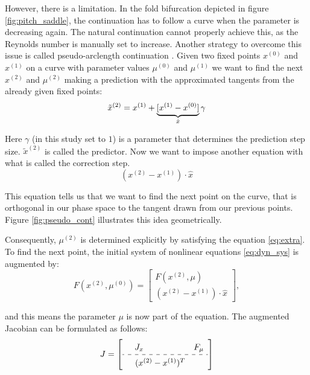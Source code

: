 However, there is a limitation. In the fold bifurcation depicted in figure
\ref{fig:pitch_saddle}, the continuation has to follow a curve when the
parameter is decreasing again. The natural continuation cannot properly achieve
this, as the Reynolds number is manually set to increase. Another strategy to
overcome this issue is called pseudo-arclength continuation
\citep{kuznetsov2004}. Given two fixed points $x^{(0)}$ and $x^{(1)}$ on a
curve with parameter values $\mu^{(0)}$ and $\mu^{(1)}$ we want to find the
next $x^{(2)}$ and $\mu^{(2)}$ making a prediction with the approximated
tangents from the already given fixed points:
\begin{equation}
  \tilde{x}^{(2)} = x^{(1)}  + \underbrace{[x^{(1)} - x^{(0)}]}_{\text{\normalfont $\hat{x}$}} \gamma
\end{equation}

Here $\gamma$ (in this study set to $1$) is a parameter that determines the
prediction step size. $\tilde{x}^{(2)}$ is called the predictor. Now we want to
impose another equation with what is called the correction step.
\begin{equation}
  (x^{(2)} - x^{(1)})  \cdot \hat{x} \label{eq:extra}
\end{equation}

This equation tells us that we want to find the next point on the curve, that is
orthogonal in our phase space to the tangent drawn from our previous points.
Figure \ref{fig:pseudo_cont} illustrates this idea geometrically.

Consequently, $\mu^{(2)}$ is determined explicitly by satisfying the equation
\eqref{eq:extra}. To find the next point, the initial system of nonlinear
equations \eqref{eq:dyn_sys} is augmented by:
\begin{equation}
  F(x^{(2)}, \mu^{(0)}) = 
\begin{bmatrix} F(x^{(2)}, \mu) \\ (x^{(2)} - x^{(1)})  \cdot \hat{x}
\end{bmatrix}, \label{eq:dyn_sys_cont}
\end{equation}

and this means the parameter $\mu$ is now part of the equation. The augmented
Jacobian can be formulated as follows: 
\begin{equation}
\renewcommand\arraystretch{1.5}
J = 
\left[
\begin{array}{cc}
  J_x \quad \quad \quad \quad & F_{\mu} \\
  \hdashline
  \quad (x^{(2)} - x^{(1)})^T
\end{array} \label{eq:jac_aug}
\right]
\end{equation}

